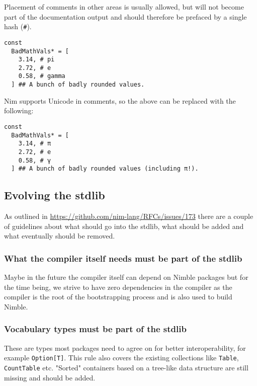 Placement of comments in other areas is usually allowed, but will not
become part of the documentation output and should therefore be prefaced
by a single hash (\texttt{\#}).

\begin{verbatim}
const
  BadMathVals* = [
    3.14, # pi
    2.72, # e
    0.58, # gamma
  ] ## A bunch of badly rounded values.
\end{verbatim}

Nim supports Unicode in comments, so the above can be replaced with the
following:

\begin{verbatim}
const
  BadMathVals* = [
    3.14, # π
    2.72, # e
    0.58, # γ
  ] ## A bunch of badly rounded values (including π!).
\end{verbatim}

\hypertarget{evolving-the-stdlib}{%
\subsection{Evolving the stdlib}\label{evolving-the-stdlib}}

As outlined in \url{https://github.com/nim-lang/RFCs/issues/173} there
are a couple of guidelines about what should go into the stdlib, what
should be added and what eventually should be removed.

\hypertarget{what-the-compiler-itself-needs-must-be-part-of-the-stdlib}{%
\subsubsection{What the compiler itself needs must be part of the
stdlib}\label{what-the-compiler-itself-needs-must-be-part-of-the-stdlib}}

Maybe in the future the compiler itself can depend on Nimble packages
but for the time being, we strive to have zero dependencies in the
compiler as the compiler is the root of the bootstrapping process and is
also used to build Nimble.

\hypertarget{vocabulary-types-must-be-part-of-the-stdlib}{%
\subsubsection{Vocabulary types must be part of the
stdlib}\label{vocabulary-types-must-be-part-of-the-stdlib}}

These are types most packages need to agree on for better
interoperability, for example \texttt{Option{[}T{]}}. This rule also
covers the existing collections like \texttt{Table}, \texttt{CountTable}
etc. "Sorted" containers based on a tree-like data structure are still
missing and should be added.

